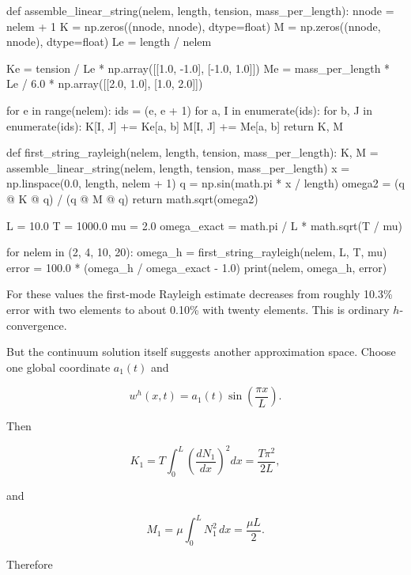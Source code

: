 \begin{python}
def assemble_linear_string(nelem, length, tension, mass_per_length):
    nnode = nelem + 1
    K = np.zeros((nnode, nnode), dtype=float)
    M = np.zeros((nnode, nnode), dtype=float)
    Le = length / nelem

    Ke = tension / Le * np.array([[1.0, -1.0], [-1.0, 1.0]])
    Me = mass_per_length * Le / 6.0 * np.array([[2.0, 1.0], [1.0, 2.0]])

    for e in range(nelem):
        ids = (e, e + 1)
        for a, I in enumerate(ids):
            for b, J in enumerate(ids):
                K[I, J] += Ke[a, b]
                M[I, J] += Me[a, b]
    return K, M


def first_string_rayleigh(nelem, length, tension, mass_per_length):
    K, M = assemble_linear_string(nelem, length, tension, mass_per_length)
    x = np.linspace(0.0, length, nelem + 1)
    q = np.sin(math.pi * x / length)
    omega2 = (q @ K @ q) / (q @ M @ q)
    return math.sqrt(omega2)


L = 10.0
T = 1000.0
mu = 2.0
omega_exact = math.pi / L * math.sqrt(T / mu)

for nelem in (2, 4, 10, 20):
    omega_h = first_string_rayleigh(nelem, L, T, mu)
    error = 100.0 * (omega_h / omega_exact - 1.0)
    print(nelem, omega_h, error)
\end{python}

For these values the first-mode Rayleigh estimate decreases from roughly 10.3\%
error with two elements to about 0.10\% with twenty elements.  This is ordinary
$h$-convergence.

But the continuum solution itself suggests another approximation space.  Choose
one global coordinate $a_1(t)$ and

\begin{equation}
    w^h(x,t)=a_1(t)\sin\left(\frac{\pi x}{L}\right).
\end{equation}

Then

\begin{equation}
    K_1
    =T\int_0^L\left(\frac{dN_1}{dx}\right)^2dx
    =\frac{T\pi^2}{2L},
\end{equation}

and

\begin{equation}
    M_1
    =\mu\int_0^L N_1^2\,dx
    =\frac{\mu L}{2}.
\end{equation}

Therefore

